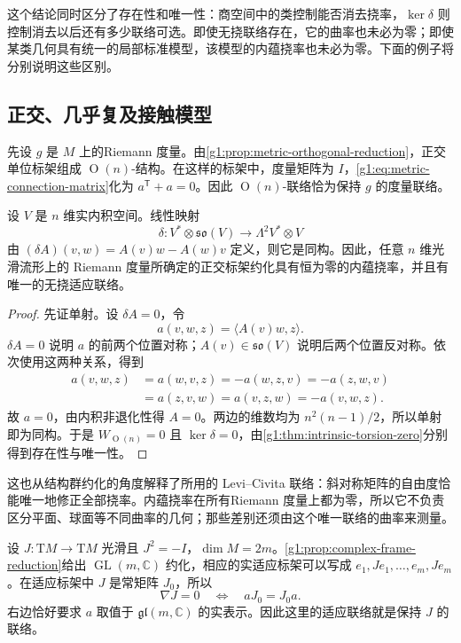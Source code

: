 这个结论同时区分了存在性和唯一性：商空间中的类控制能否消去挠率，\(\ker\delta\) 则控制消去以后还有多少联络可选。即使无挠联络存在，它的曲率也未必为零；即使某类几何具有统一的局部标准模型，该模型的内蕴挠率也未必为零。下面的例子将分别说明这些区别。

\subsection{正交、几乎复及接触模型}
\label{g1:subsec:D01:03}

先设 \(g\) 是 \(M\) 上的Riemann 度量。由\cref{g1:prop:metric-orthogonal-reduction}，正交单位标架组成 \(\operatorname{O}(n)\)-结构。在这样的标架中，度量矩阵为 \(I\)，\cref{g1:eq:metric-connection-matrix}化为 \(a^{\mathsf T}+a=0\)。因此 \(\operatorname{O}(n)\)-联络恰为保持 \(g\) 的度量联络。

\begin{proposition}
	\label{g1:prop:orthogonal-delta-isomorphism}
	设 \(V\) 是 \(n\) 维实内积空间。线性映射
	\[
		\delta:V^*\otimes\mathfrak{so}(V)\longrightarrow\Lambda^2V^*\otimes V
	\]
	由 \((\delta A)(v,w)=A(v)w-A(w)v\) 定义，则它是同构。因此，任意 \(n\) 维光滑流形上的 Riemann 度量所确定的正交标架约化具有恒为零的内蕴挠率，并且有唯一的无挠适应联络。
\end{proposition}
\begin{proof}
	先证单射。设 \(\delta A=0\)，令
	\[
		a(v,w,z)=\langle A(v)w,z\rangle.
	\]
	\(\delta A=0\) 说明 \(a\) 的前两个位置对称；\(A(v)\in\mathfrak{so}(V)\) 说明后两个位置反对称。依次使用这两种关系，得到
	\[
	\begin{aligned}
		a(v,w,z)&=a(w,v,z)=-a(w,z,v)=-a(z,w,v)\\
		&=a(z,v,w)=a(v,z,w)=-a(v,w,z).
	\end{aligned}
	\]
	故 \(a=0\)，由内积非退化性得 \(A=0\)。两边的维数均为 \(n^2(n-1)/2\)，所以单射即为同构。于是 \(W_{\operatorname{O}(n)}=0\) 且 \(\ker\delta=0\)，由\cref{g1:thm:intrinsic-torsion-zero}分别得到存在性与唯一性。
\end{proof}

这也从结构群约化的角度解释了所用的 Levi--Civita 联络：斜对称矩阵的自由度恰能唯一地修正全部挠率。内蕴挠率在所有Riemann 度量上都为零，所以它不负责区分平面、球面等不同曲率的几何；那些差别还须由这个唯一联络的曲率来测量。

\ProseParagraphBreak

设 \(J:\mathrm{T}M\to\mathrm{T}M\) 光滑且 \(J^2=-I\)，\(\dim M=2m\)。\cref{g1:prop:complex-frame-reduction}给出 \(\operatorname{GL}(m,\mathbb C)\) 约化，相应的实适应标架可以写成 \(e_1,Je_1,\ldots,e_m,Je_m\)。在适应标架中 \(J\) 是常矩阵 \(J_0\)，所以
\[
	\nabla J=0\quad\Longleftrightarrow\quad aJ_0=J_0a.
\]
右边恰好要求 \(a\) 取值于 \(\mathfrak{gl}(m,\mathbb C)\) 的实表示。因此这里的适应联络就是保持 \(J\) 的联络。


